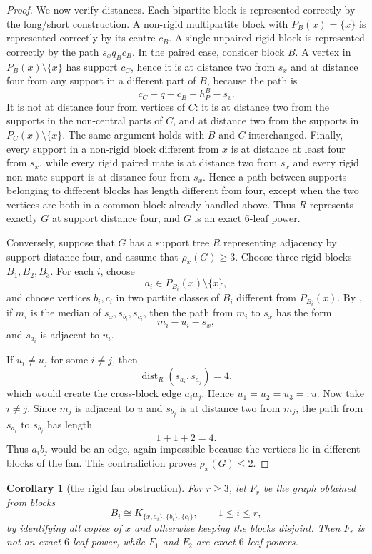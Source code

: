 \documentclass[11pt]{article}
\newtheorem{corollary}[theorem]{Corollary}
\theoremstyle{definition}
\newcommand{\dist}{\operatorname{dist}}
\begin{document}
\begin{proof}
We now verify distances.  Each bipartite block is represented correctly by the long/short construction.  A non-rigid multipartite block with $P_B(x)=\{x\}$ is represented correctly by its centre $c_B$.  A single unpaired rigid block is represented correctly by the path $s_xq_Bc_B$.  In the paired case, consider block $B$.  A vertex in $P_B(x)\setminus\{x\}$ has support $c_C$, hence it is at distance two from $s_x$ and at distance four from any support in a different part of $B$, because the path is
\[
 c_C-q-c_B-h^B_P-s_v .
\]
It is not at distance four from vertices of $C$: it is at distance two from the supports in the non-central parts of $C$, and at distance two from the supports in $P_C(x)\setminus\{x\}$.  The same argument holds with $B$ and $C$ interchanged.  Finally, every support in a non-rigid block different from $x$ is at distance at least four from $s_x$, while every rigid paired mate is at distance two from $s_x$ and every rigid non-mate support is at distance four from $s_x$.  Hence a path between supports belonging to different blocks has length different from four, except when the two vertices are both in a common block already handled above.  Thus $R$ represents exactly $G$ at support distance four, and $G$ is an exact $6$-leaf power.

Conversely, suppose that $G$ has a support tree $R$ representing adjacency by support distance four, and assume that $\rho_x(G)\ge3$.  Choose three rigid blocks $B_1,B_2,B_3$.  For each $i$, choose
\[
 a_i\in P_{B_i}(x)\setminus\{x\},
\]
and choose vertices $b_i,c_i$ in two partite classes of $B_i$ different from $P_{B_i}(x)$.  By , if $m_i$ is the median of $s_x,s_{b_i},s_{c_i}$, then the path from $m_i$ to $s_x$ has the form
\[
 m_i-u_i-s_x,
\]
and $s_{a_i}$ is adjacent to $u_i$.

If $u_i\ne u_j$ for some $i\ne j$, then
\[
 \dist_R(s_{a_i},s_{a_j})=4,
\]
which would create the cross-block edge $a_ia_j$.  Hence $u_1=u_2=u_3=:u$.  Now take $i\ne j$.  Since $m_j$ is adjacent to $u$ and $s_{b_j}$ is at distance two from $m_j$, the path from $s_{a_i}$ to $s_{b_j}$ has length
\[
 1+1+2=4.
\]
Thus $a_i b_j$ would be an edge, again impossible because the vertices lie in different blocks of the fan.  This contradiction proves $\rho_x(G)\le2$.
\end{proof}

\begin{corollary}[the rigid fan obstruction]
\label{cor:k6-rigid-fan}
For $r\ge3$, let $F_r$ be the graph obtained from blocks
\[
 B_i\cong K_{\{x,a_i\},\{b_i\},\{c_i\}}, \qquad 1\le i\le r,
\]
by identifying all copies of $x$ and otherwise keeping the blocks disjoint.  Then $F_r$ is not an exact $6$-leaf power, while $F_1$ and $F_2$ are exact $6$-leaf powers.
\end{corollary}
\end{document}
